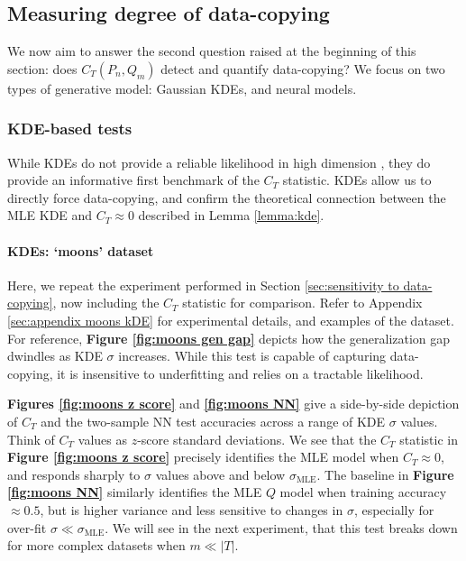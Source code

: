 \subsection{Measuring degree of data-copying}
We now aim to answer the second question raised at the beginning of this section: does $C_T(P_n, Q_m)$ detect and quantify data-copying? We focus on two types of generative model: Gaussian KDEs, and neural models.

\subsubsection{KDE-based tests}
\label{sec:KDE experiments}
 While KDEs do not provide a reliable likelihood in high dimension \citep{theis}, they do provide an informative first benchmark of the $C_T$ statistic. KDEs allow us to directly force data-copying, and confirm the theoretical connection between the MLE KDE and $C_T \approx 0$ described in Lemma \ref{lemma:kde}.

\paragraph{KDEs: `moons' dataset}

Here, we repeat the experiment performed in Section \ref{sec:sensitivity to data-copying}, now including the $C_T$ statistic for comparison. Refer to Appendix \ref{sec:appendix moons kDE} for experimental details, and examples of the dataset. For reference, \textbf{Figure \ref{fig:moons gen gap}} depicts how the generalization gap dwindles as KDE $\sigma$ increases. While this test is capable of capturing data-copying, it is insensitive to underfitting and relies on a tractable likelihood.

\textbf{Figures \ref{fig:moons z score}} and \textbf{ \ref{fig:moons NN}} give a side-by-side depiction of $C_T$ and the two-sample NN test accuracies across a range of KDE $\sigma$ values. Think of $C_T$ values as $z$-score standard deviations. We see that the $C_T$ statistic in \textbf{Figure \ref{fig:moons z score}} precisely identifies the MLE model when $C_T \approx 0$, and responds sharply to $\sigma$ values above and below $\sigma_{\text{MLE}}$. The baseline in \textbf{Figure \ref{fig:moons NN}} similarly identifies the MLE $Q$ model when training accuracy $\approx 0.5$, but is higher variance and less sensitive to changes in $\sigma$, especially for over-fit $\sigma \ll \sigma_{\text{MLE}}$. We will see in the next experiment, that this test breaks down for more complex datasets when $m \ll |T|$. 

